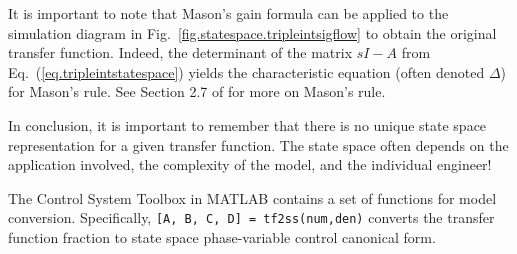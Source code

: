 It is important to note that Mason's gain formula can be applied to the simulation diagram in Fig.\ \ref{fig.statespace.tripleintsigflow} to obtain the original transfer function.  Indeed, the determinant of the matrix $sI-A$ from Eq.~(\ref{eq.tripleintstatespace}) yields the characteristic equation (often denoted $\Delta$) for Mason's rule.  See Section 2.7 of \cite{dorf} for more on Mason's rule.
\par
In conclusion, it is important to remember that there is no unique state space representation for a given transfer function.  The state space often depends on the application involved, the complexity of the model, and the individual engineer!
\par
The Control System Toolbox in MATLAB contains a set of functions for model conversion.  Specifically, \verb#[A, B, C, D] = tf2ss(num,den)# converts the transfer function fraction to state space phase-variable control canonical form.

